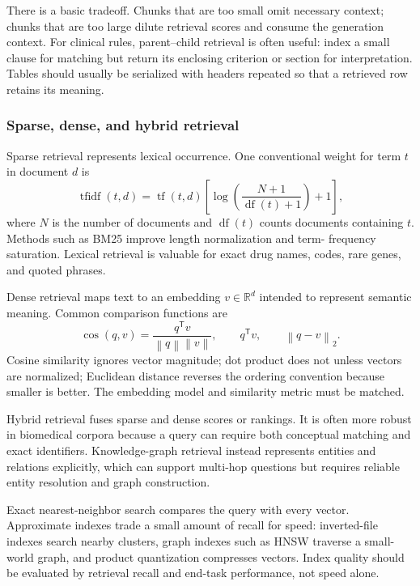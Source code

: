 \documentclass[12pt,oneside]{book}
\numberwithin{equation}{section}
\theoremstyle{definition}
\theoremstyle{plain}
\theoremstyle{remark}
\newcommand{\R}{\mathbb{R}}
\newcommand{\norm}[1]{\left\lVert #1 \right\rVert}
\begin{document}
There is a basic tradeoff.  Chunks that are too small omit necessary context;
chunks that are too large dilute retrieval scores and consume the generation
context.  For clinical rules, parent--child retrieval is often useful: index a
small clause for matching but return its enclosing criterion or section for
interpretation.  Tables should usually be serialized with headers repeated so
that a retrieved row retains its meaning.

\subsubsection{Sparse, dense, and hybrid retrieval}

Sparse retrieval represents lexical occurrence.  One conventional weight for
term $t$ in document $d$ is
\[
 \operatorname{tfidf}(t,d)
 =\operatorname{tf}(t,d)
 \left[\log\!\left(\frac{N+1}{\operatorname{df}(t)+1}\right)+1\right],
\]
where $N$ is the number of documents and $\operatorname{df}(t)$ counts documents
containing $t$.  Methods such as BM25 improve length normalization and term-
frequency saturation.  Lexical retrieval is valuable for exact drug names,
codes, rare genes, and quoted phrases.

Dense retrieval maps text to an embedding $v\in\R^d$ intended to represent
semantic meaning.  Common comparison functions are
\[
 \operatorname{cos}(q,v)=\frac{q^\mathsf Tv}{\norm{q}\norm{v}},
 \qquad q^\mathsf Tv,
 \qquad \norm{q-v}_2.
\]
Cosine similarity ignores vector magnitude; dot product does not unless vectors
are normalized; Euclidean distance reverses the ordering convention because
smaller is better.  The embedding model and similarity metric must be matched.

Hybrid retrieval fuses sparse and dense scores or rankings.  It is often more
robust in biomedical corpora because a query can require both conceptual
matching and exact identifiers.  Knowledge-graph retrieval instead represents
entities and relations explicitly, which can support multi-hop questions but
requires reliable entity resolution and graph construction.

Exact nearest-neighbor search compares the query with every vector.  Approximate
indexes trade a small amount of recall for speed: inverted-file indexes search
nearby clusters, graph indexes such as HNSW traverse a small-world graph, and
product quantization compresses vectors.  Index quality should be evaluated by
retrieval recall and end-task performance, not speed alone.
\end{document}

